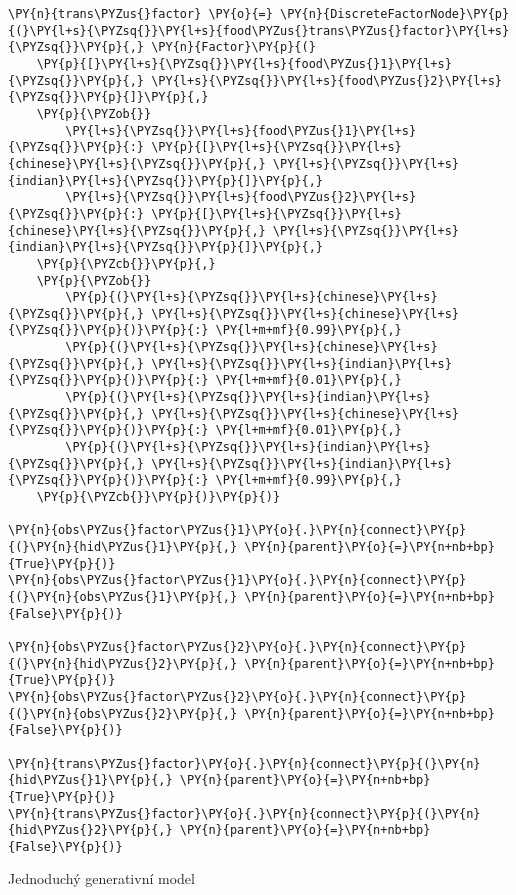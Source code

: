 \begin{example}
\begin{Verbatim}[commandchars=\\\{\}, fontsize=\relsize{-1}]
\PY{n}{trans\PYZus{}factor} \PY{o}{=} \PY{n}{DiscreteFactorNode}\PY{p}{(}\PY{l+s}{\PYZsq{}}\PY{l+s}{food\PYZus{}trans\PYZus{}factor}\PY{l+s}{\PYZsq{}}\PY{p}{,} \PY{n}{Factor}\PY{p}{(}
    \PY{p}{[}\PY{l+s}{\PYZsq{}}\PY{l+s}{food\PYZus{}1}\PY{l+s}{\PYZsq{}}\PY{p}{,} \PY{l+s}{\PYZsq{}}\PY{l+s}{food\PYZus{}2}\PY{l+s}{\PYZsq{}}\PY{p}{]}\PY{p}{,}
    \PY{p}{\PYZob{}}
        \PY{l+s}{\PYZsq{}}\PY{l+s}{food\PYZus{}1}\PY{l+s}{\PYZsq{}}\PY{p}{:} \PY{p}{[}\PY{l+s}{\PYZsq{}}\PY{l+s}{chinese}\PY{l+s}{\PYZsq{}}\PY{p}{,} \PY{l+s}{\PYZsq{}}\PY{l+s}{indian}\PY{l+s}{\PYZsq{}}\PY{p}{]}\PY{p}{,}
        \PY{l+s}{\PYZsq{}}\PY{l+s}{food\PYZus{}2}\PY{l+s}{\PYZsq{}}\PY{p}{:} \PY{p}{[}\PY{l+s}{\PYZsq{}}\PY{l+s}{chinese}\PY{l+s}{\PYZsq{}}\PY{p}{,} \PY{l+s}{\PYZsq{}}\PY{l+s}{indian}\PY{l+s}{\PYZsq{}}\PY{p}{]}\PY{p}{,}
    \PY{p}{\PYZcb{}}\PY{p}{,}
    \PY{p}{\PYZob{}}
        \PY{p}{(}\PY{l+s}{\PYZsq{}}\PY{l+s}{chinese}\PY{l+s}{\PYZsq{}}\PY{p}{,} \PY{l+s}{\PYZsq{}}\PY{l+s}{chinese}\PY{l+s}{\PYZsq{}}\PY{p}{)}\PY{p}{:} \PY{l+m+mf}{0.99}\PY{p}{,}
        \PY{p}{(}\PY{l+s}{\PYZsq{}}\PY{l+s}{chinese}\PY{l+s}{\PYZsq{}}\PY{p}{,} \PY{l+s}{\PYZsq{}}\PY{l+s}{indian}\PY{l+s}{\PYZsq{}}\PY{p}{)}\PY{p}{:} \PY{l+m+mf}{0.01}\PY{p}{,}
        \PY{p}{(}\PY{l+s}{\PYZsq{}}\PY{l+s}{indian}\PY{l+s}{\PYZsq{}}\PY{p}{,} \PY{l+s}{\PYZsq{}}\PY{l+s}{chinese}\PY{l+s}{\PYZsq{}}\PY{p}{)}\PY{p}{:} \PY{l+m+mf}{0.01}\PY{p}{,}
        \PY{p}{(}\PY{l+s}{\PYZsq{}}\PY{l+s}{indian}\PY{l+s}{\PYZsq{}}\PY{p}{,} \PY{l+s}{\PYZsq{}}\PY{l+s}{indian}\PY{l+s}{\PYZsq{}}\PY{p}{)}\PY{p}{:} \PY{l+m+mf}{0.99}\PY{p}{,}
    \PY{p}{\PYZcb{}}\PY{p}{)}\PY{p}{)}

\PY{n}{obs\PYZus{}factor\PYZus{}1}\PY{o}{.}\PY{n}{connect}\PY{p}{(}\PY{n}{hid\PYZus{}1}\PY{p}{,} \PY{n}{parent}\PY{o}{=}\PY{n+nb+bp}{True}\PY{p}{)}
\PY{n}{obs\PYZus{}factor\PYZus{}1}\PY{o}{.}\PY{n}{connect}\PY{p}{(}\PY{n}{obs\PYZus{}1}\PY{p}{,} \PY{n}{parent}\PY{o}{=}\PY{n+nb+bp}{False}\PY{p}{)}

\PY{n}{obs\PYZus{}factor\PYZus{}2}\PY{o}{.}\PY{n}{connect}\PY{p}{(}\PY{n}{hid\PYZus{}2}\PY{p}{,} \PY{n}{parent}\PY{o}{=}\PY{n+nb+bp}{True}\PY{p}{)}
\PY{n}{obs\PYZus{}factor\PYZus{}2}\PY{o}{.}\PY{n}{connect}\PY{p}{(}\PY{n}{obs\PYZus{}2}\PY{p}{,} \PY{n}{parent}\PY{o}{=}\PY{n+nb+bp}{False}\PY{p}{)}

\PY{n}{trans\PYZus{}factor}\PY{o}{.}\PY{n}{connect}\PY{p}{(}\PY{n}{hid\PYZus{}1}\PY{p}{,} \PY{n}{parent}\PY{o}{=}\PY{n+nb+bp}{True}\PY{p}{)}
\PY{n}{trans\PYZus{}factor}\PY{o}{.}\PY{n}{connect}\PY{p}{(}\PY{n}{hid\PYZus{}2}\PY{p}{,} \PY{n}{parent}\PY{o}{=}\PY{n+nb+bp}{False}\PY{p}{)}
\end{Verbatim}
\caption{Jednoduchý generativní model}
\label{lst:nodex}
\end{example}


